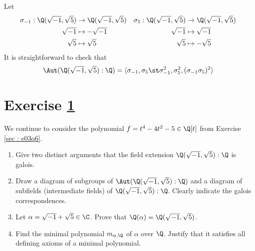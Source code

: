 {Let
\begin{align*}
\sigma_{-1}
:
\Q(\sqrt{-1}, \sqrt{5})
&\rightarrow
\Q(\sqrt{-1}, \sqrt{5})
&
\sigma_{5}
:
\Q(\sqrt{-1}, \sqrt{5})
&\rightarrow
\Q(\sqrt{-1}, \sqrt{5})
\\
\sqrt{-1}
&\mapsto
-\sqrt{-1}
&
\sqrt{-1}
&\mapsto
\sqrt{-1}
\\
\sqrt{5}
&\mapsto
\sqrt{5}
&
\sqrt{5}
&\mapsto
-\sqrt{5}
\end{align*}
It is straightforward to check that
\begin{align*}
\Aut(\Q(\sqrt{-1}, \sqrt{5}) : \Q)
=
\langle{}\sigma_{-1}, \sigma_{5} \st \sigma_{-1}^{2}, \sigma_{5}^{2}, (\sigma_{-1} \sigma_{5})^{2}\rangle{}
\end{align*}%
}%



\section{Exercise \ref{sec : e03q7}}
\label{sec : e03q7}

\noindent{}We continue to consider the polynomial $f = t^{4} - 4 t^{2} - 5 \in \Q[t]$ from Exercise \ref{sec : e03q6}.
\begin{enumerate}[label=(\alph*)]
\item\label{itm : e03q7a} Give two distinct arguments that the field extension $\Q(\sqrt{-1}, \sqrt{5}) : \Q$ is galois.
\item\label{itm : e03q7b} Draw a diagram of subgroups of $\Aut(\Q(\sqrt{-1}, \sqrt{5}) : \Q)$ and a diagram of subfields (intermediate fields) of $\Q(\sqrt{-1}, \sqrt{5}) : \Q$. Clearly indicate the galois correspondences.
\item\label{itm : e03q7c} Let $\alpha = \sqrt{-1} + \sqrt{5} \in \C$. Prove that $\Q(\alpha) = \Q(\sqrt{-1}, \sqrt{5})$. 
\item\label{itm : e03q7d} Find the minimal polynomial $m_{\alpha, \Q}$ of $\alpha$ over $\Q$. Justify that it satisfies all defining axioms of a minimal polynomial.
\end{enumerate}

